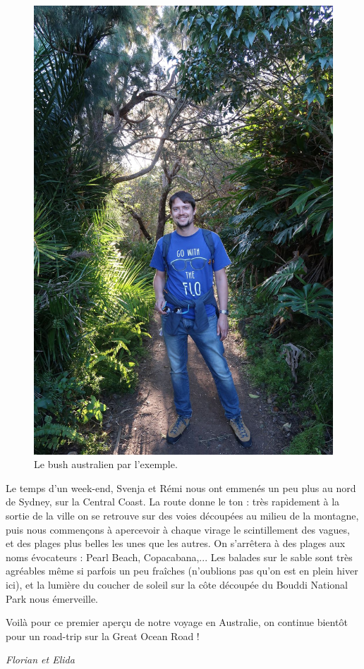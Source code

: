 \begin{figure}
\centering
\includegraphics{images/20180726_bush.JPG}
\caption{Le bush australien par l'exemple.}
\end{figure}

Le temps d'un week-end, Svenja et Rémi nous ont emmenés un peu plus au
nord de Sydney, sur la Central Coast. La route donne le ton : très
rapidement à la sortie de la ville on se retrouve sur des voies
découpées au milieu de la montagne, puis nous commençons à apercevoir à
chaque virage le scintillement des vagues, et des plages plus belles les
unes que les autres. On s'arrêtera à des plages aux noms évocateurs :
Pearl Beach, Copacabana,... Les balades sur le sable sont très agréables
même si parfois un peu fraîches (n'oublions pas qu'on est en plein hiver
ici), et la lumière du coucher de soleil sur la côte découpée du Bouddi
National Park nous émerveille.

Voilà pour ce premier aperçu de notre voyage en Australie, on continue
bientôt pour un road-trip sur la Great Ocean Road !

\emph{Florian et Elida}
